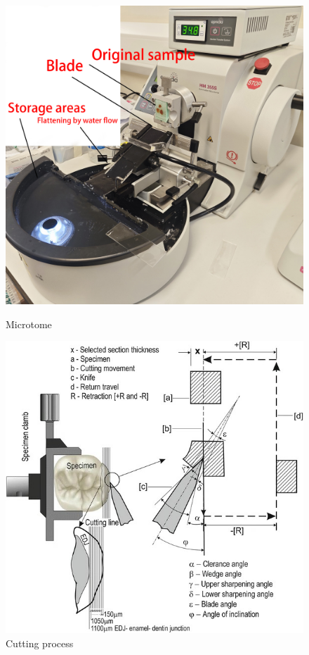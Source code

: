 \begin{figure}[H]
    \centering
    \begin{minipage}{0.35\textwidth}
        \centering
        \includegraphics[width=\textwidth]{./fig/machine - 副本.jpg}
        \caption{Microtome}
        \label{fig:machine}
    \end{minipage}
    \begin{minipage}{0.35\textwidth}
        \centering
        \includegraphics[width=\textwidth]{./fig/10266_2018_353_Fig1_HTML.jpg}
        \caption{Cutting process}
        \label{fig:cutting_machine}
    \end{minipage}
\end{figure}

